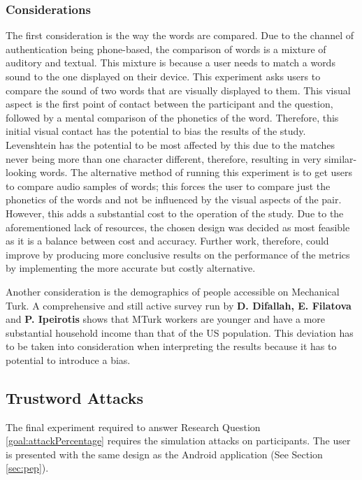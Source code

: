 \subsubsection{Considerations}
\label{sec:exp1_considerations}

The first consideration is the way the words are compared. Due to the channel of authentication being phone-based, the comparison of words is a mixture of auditory and textual. This mixture is because a user needs to match a words sound to the one displayed on their device. This experiment asks users to compare the sound of two words that are visually displayed to them. This visual aspect is the first point of contact between the participant and the question, followed by a mental comparison of the phonetics of the word. Therefore, this initial visual contact has the potential to bias the results of the study. Levenshtein has the potential to be most affected by this due to the matches never being more than one character different, therefore, resulting in very similar-looking words. The alternative method of running this experiment is to get users to compare audio samples of words; this forces the user to compare just the phonetics of the words and not be influenced by the visual aspects of the pair. However, this adds a substantial cost to the operation of the study. Due to the aforementioned lack of resources, the chosen design was decided as most feasible as it is a balance between cost and accuracy. Further work, therefore, could improve by producing more conclusive results on the performance of the metrics by implementing the more accurate but costly alternative.

Another consideration is the demographics of people accessible on Mechanical Turk. A comprehensive and still active survey run by \textbf{D. Difallah, E. Filatova} and \textbf{P. Ipeirotis}\cite{difallah2018demographics} shows that MTurk workers are younger and have a more substantial household income than that of the US population. This deviation has to be taken into consideration when interpreting the results because it has to potential to introduce a bias.

\subsection{Trustword Attacks}
\label{sec:exp2_design}


The final experiment required to answer Research Question \ref{goal:attackPercentage} requires the simulation attacks on participants. The user is presented with the same design as the \pep Android application (See Section \ref{sec:pep}).

